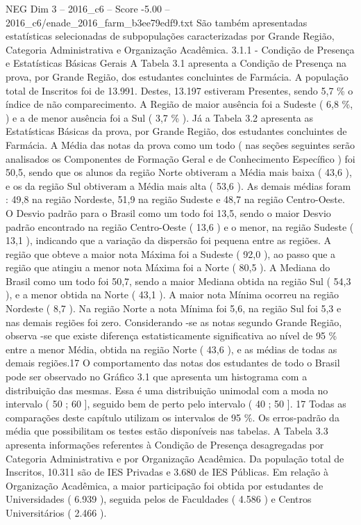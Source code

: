 \begin{textsample}{NEG Dim 3 – 2016\_c6 – Score -5.00 – 2016\_c6/enade\_2016\_farm\_b3ee79edf9.txt}
São também apresentadas estatísticas selecionadas de subpopulações caracterizadas por Grande Região, Categoria Administrativa e Organização Acadêmica. 3.1.1 - Condição de Presença e Estatísticas Básicas Gerais A Tabela 3.1 apresenta a Condição de Presença na prova, por Grande Região, dos estudantes concluintes de Farmácia.
A população total de Inscritos foi de 13.991.
Destes, 13.197 estiveram Presentes, sendo 5,7 \% o índice de não comparecimento.
A Região de maior ausência foi a Sudeste ( 6,8 \%, ) e a de menor ausência foi a Sul ( 3,7 \% ).
Já a Tabela 3.2 apresenta as Estatísticas Básicas da prova, por Grande Região, dos estudantes concluintes de Farmácia.
A Média das notas da prova como um todo ( nas seções seguintes serão analisados os Componentes de Formação Geral e de Conhecimento Específico ) foi 50,5, sendo que os alunos da região Norte obtiveram a Média mais baixa ( 43,6 ), e os da região Sul obtiveram a Média mais alta ( 53,6 ).
As demais médias foram : 49,8 na região Nordeste, 51,9 na região Sudeste e 48,7 na região Centro-Oeste.
O Desvio padrão para o Brasil como um todo foi 13,5, sendo o maior Desvio padrão encontrado na região Centro-Oeste ( 13,6 ) e o menor, na região Sudeste ( 13,1 ), indicando que a variação da dispersão foi pequena entre as regiões.
A região que obteve a maior nota Máxima foi a Sudeste ( 92,0 ), ao passo que a região que atingiu a menor nota Máxima foi a Norte ( 80,5 ).
A Mediana do Brasil como um todo foi 50,7, sendo a maior Mediana obtida na região Sul ( 54,3 ), e a menor obtida na Norte ( 43,1 ).
A maior nota Mínima ocorreu na região Nordeste ( 8,7 ).
Na região Norte a nota Mínima foi 5,6, na região Sul foi 5,3 e nas demais regiões foi zero.
Considerando -se as notas segundo Grande Região, observa -se que existe diferença estatisticamente significativa ao nível de 95 \% entre a menor Média, obtida na região Norte ( 43,6 ), e as médias de todas as demais regiões.17 O comportamento das notas dos estudantes de todo o Brasil pode ser observado no Gráfico 3.1 que apresenta um histograma com a distribuição das mesmas.
Essa é uma distribuição unimodal com a moda no intervalo ( 50 ; 60 ], seguido bem de perto pelo intervalo ( 40 ; 50 ]. 17 Todas as comparações deste capítulo utilizam os intervalos de 95 \%.
Os erros-padrão da média que possibilitam os testes estão disponíveis nas tabelas.
A Tabela 3.3 apresenta informações referentes à Condição de Presença desagregadas por Categoria Administrativa e por Organização Acadêmica.
Da população total de Inscritos, 10.311 são de IES Privadas e 3.680 de IES Públicas.
Em relação à Organização Acadêmica, a maior participação foi obtida por estudantes de Universidades ( 6.939 ), seguida pelos de Faculdades ( 4.586 ) e Centros Universitários ( 2.466 ).

\end{textsample}

